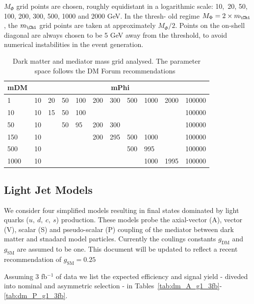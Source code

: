 $M_{\Phi}$ grid points are chosen, roughly equidistant in a logarithmic scale: 10,~20, 50, 100, 200, 300, 500, 1000 and 2000 GeV. In the thresh-
old regime $M_{\Phi} = 2 \times m_{\Chi}$, the $ m_{\Chi}$ grid points are taken at approximately $M_{\Phi}/2$. Points on the on-shell diagonal are always chosen to be
5 GeV away from the threshold, to avoid numerical instabilities in the event generation. 


\begin{table}[h!]
\centering
\begin{tabular}{l|llllllllll}\hline
mDM  & \multicolumn{10}{c}{mPhi}                                   \\ \hline
1    & 10 & 20 & 50 & 100 & 200 & 300 & 500 & 1000 & 2000 & 100000 \\
10   & 10 & 15 & 50 & 100 &     &     &     &      &      & 100000 \\
50   & 10 &    & 50 & 95  & 200 & 300 &     &      &      & 100000 \\
150  & 10 &    &    &     & 200 & 295 & 500 & 1000 &      & 100000 \\
500  & 10 &    &    &     &     &     & 500 & 995  &      & 100000 \\
1000 & 10 &    &    &     &     &     &     & 1000 & 1995 & 100000\\ \hline
\end{tabular}
\caption{Dark matter and mediator mass grid analysed. The parameter space follows the DM Forum recommendations~\cite{Abercrombie:2015wmb}}
\label{tab:DMgrid}
\end{table}

\subsection{Light Jet Models}


We consider four simplified models resulting in final states dominated by light quarks ($u,~d,~c,~s$) production. These models probe the axial-vector (A), vector (V), scalar (S) and pseudo-scalar (P) coupling of the mediator between dark matter and stnadard model particles. Currently the coulings constants $g_\textrm{DM}$ and $g_\textrm{SM}$ are assumed to be one. This document will be updated to reflect a recent recommendation of $g_\textrm{SM}=0.25$

Assuming 3 fb$^{-1}$ of data we list the expected efficiency and signal yield - diveded into nominal and asymmetric selection - in Tables~\ref{tab:dm_A_g1_3fb}-\ref{tab:dm_P_g1_3fb}.

